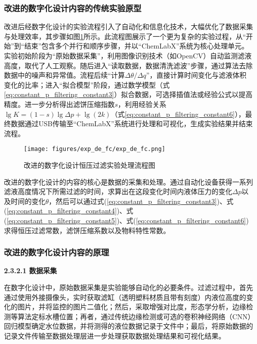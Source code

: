 \documentclass[UTF8,a4paper,fontset=none]{ctexart}
\newcommand{\wuhao}{\fontsize{10.5pt}{15pt}\selectfont}       %
\begin{document}
\subsubsection{改进的数字化设计内容的传统实验原型}

改进后经数字化设计的实验流程引入了自动化和信息化技术，大幅优化了数据采集与处理效率，其步骤如图\ref{fig:exp_de_fc}所示。此流程图展示了一个更为复杂的实验过程，从“开始”到“结束”包含多个并行和顺序步骤，并以“ChemLabX”系统为核心处理单元。实验初始阶段为“原始数据采集”，利用图像识别技术（如OpenCV）自动监测滤液高度，取代了人工观察。随后进入“读取数据，数据清洗滤波”步骤，通过算法去除数据中的噪声和异常值。流程后续“计算\(\Delta \theta / \Delta q\)”，直接计算时间变化与滤液体积变化的比率；进入“拟合模型”阶段，通过数学模型（式\ref{eq:constant_p_filtering_constant3}）拟合数据，可选择插值法或经验公式以提高精度。进一步分析得出滤饼压缩指数\(s\)，利用经验关系\(\lg K = (1 - s) \lg \Delta p + \lg (2k)\)（式\ref{eq:constant_p_filtering_constant6}），最终数据通过USB传输至“ChemLabX”系统进行处理和可视化，生成实验结果并结束流程。

\begin{figure}[H]
    \centering
    \texttt{[image: figures/exp\_de\_fc/exp\_de\_fc.png]}
    \caption{改进的数字化设计恒压过滤实验处理流程图}
    \label{fig:exp_de_fc}
\end{figure}

改进的数字化设计的内容的核心是数据的采集和处理。通过自动化设备获得一系列滤液高度情况下所需过滤的时间，求算出在这段变化时间内液体压力的变化\(\Delta p\)以及时间的变化\(\theta\)，然后可以通过式(\ref{eq:constant_p_filtering_constant3})、式(\ref{eq:constant_p_filtering_constant4})、式(\ref{eq:constant_p_filtering_constant5})、式(\ref{eq:constant_p_filtering_constant6})求得恒压过滤常数，滤饼压缩系数以及物料特性常数。

\subsubsection{改进的数字化设计内容的原理}

{\noindent \wuhao \rmfamily {} \textbf{2.3.2.1 \quad 数据采集}}




在数字化设计中，原始数据采集是实验能够自动化的必要条件。过滤过程中，首先通过使用外接摄像头，实时获取滤缸（透明塑料材质且带有刻度）内液位高度的变化的图片，并将监控的图片二值化；然后，采取增强对比度，形态学分析，边缘检测等算法定标水槽位置；再者，通过传统边缘检测或可选的卷积神经网络（CNN）回归模型确定水位数据，并将测得的液位数据记录于文件中；最后，将原始数据的记录文件传输至数据处理层进一步处理获取数据处理结果和可视化结果。
\end{document}
